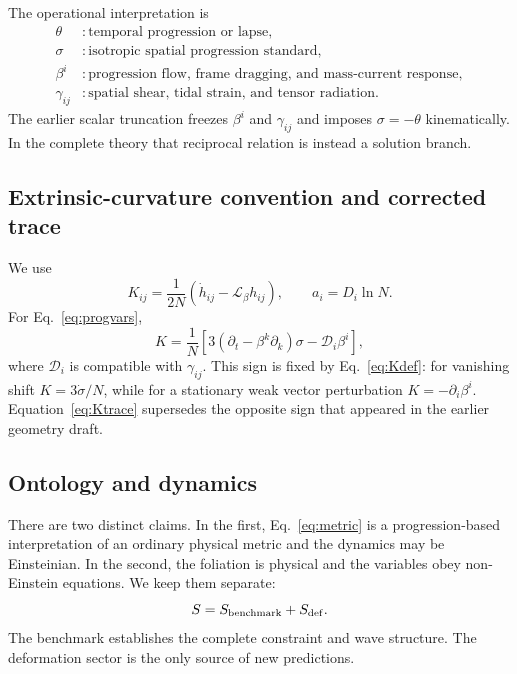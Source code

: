 \documentclass[11pt]{article}
\newcommand{\Lie}{\mathcal L}
\begin{document}
The operational interpretation is
\begin{align}
\theta &: \text{temporal progression or lapse},\nonumber\\
\sigma &: \text{isotropic spatial progression standard},\nonumber\\
\beta^i &: \text{progression flow, frame dragging, and mass-current response},\nonumber\\
\gamma_{ij} &: \text{spatial shear, tidal strain, and tensor radiation}.
\end{align}
The earlier scalar truncation freezes $\beta^i$ and $\gamma_{ij}$ and imposes $\sigma=-\theta$ kinematically.  In the complete theory that reciprocal relation is instead a solution branch.

\subsection{Extrinsic-curvature convention and corrected trace}

We use
\begin{equation}
K_{ij}=\frac{1}{2N}\left(\dot h_{ij}-\Lie_{\beta}h_{ij}\right),
\qquad a_i=D_i\ln N.
\label{eq:Kdef}
\end{equation}
For Eq.~\eqref{eq:progvars},
\begin{equation}
K=\frac{1}{N}\left[3(\partial_t-\beta^k\partial_k)\sigma-\mathcal D_i\beta^i\right],
\label{eq:Ktrace}
\end{equation}
where $\mathcal D_i$ is compatible with $\gamma_{ij}$.  This sign is fixed by Eq.~\eqref{eq:Kdef}: for vanishing shift $K=3\dot\sigma/N$, while for a stationary weak vector perturbation $K=-\partial_i\beta^i$.  Equation~\eqref{eq:Ktrace} supersedes the opposite sign that appeared in the earlier geometry draft.

\subsection{Ontology and dynamics}

There are two distinct claims.  In the first, Eq.~\eqref{eq:metric} is a progression-based interpretation of an ordinary physical metric and the dynamics may be Einsteinian.  In the second, the foliation is physical and the variables obey non-Einstein equations.  We keep them separate:
\begin{equation}
S=S_{\rm benchmark}+S_{\rm def}.
\label{eq:split}
\end{equation}
The benchmark establishes the complete constraint and wave structure.  The deformation sector is the only source of new predictions.
\end{document}
